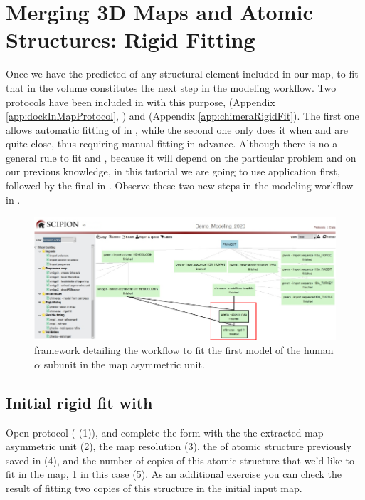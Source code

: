 \section{Merging 3D Maps and Atomic Structures: Rigid Fitting}
Once we have the predicted  of any structural element included in our map, to fit that  in the volume constitutes the next step in the modeling workflow. Two protocols have been included in \scipion with this purpose,  (Appendix \ref{app:dockInMapProtocol}, \citep{Liebschner2019}) and  (Appendix \ref{app:chimeraRigidFit}). The first one allows automatic fitting of  in , while the second one only does it when  and  are quite close, thus requiring manual fitting in advance. Although there is no a general rule to fit  and , because it will depend on the particular problem and on our previous knowledge, in this tutorial we are going to use \phenix {} application first, followed by the final  in \chimera {}. Observe these two new steps in the modeling \scipion workflow in .

 \begin{figure}[H]
  \centering 
  \captionsetup{width=.9\linewidth} 
  \includegraphics[width=1\textwidth]{Images/Fig67}
  \caption{\scipion framework detailing the workflow to fit the first model of the human  $\alpha$ subunit in the map asymmetric unit.}
  \label{fig:scipion_workflow_rigidfit}
  \end{figure}

\subsection*{Initial rigid fit with \phenix {}}
 Open  protocol ( (1)), and complete the form with the the extracted map asymmetric unit (2), the map resolution (3), the  of atomic structure previously saved in \chimera (4),  and the number of copies of this atomic structure that we'd like to fit in the map, 1 in this case (5). As an additional exercise you can check the result of fitting two copies of this structure in the initial input map.
 
